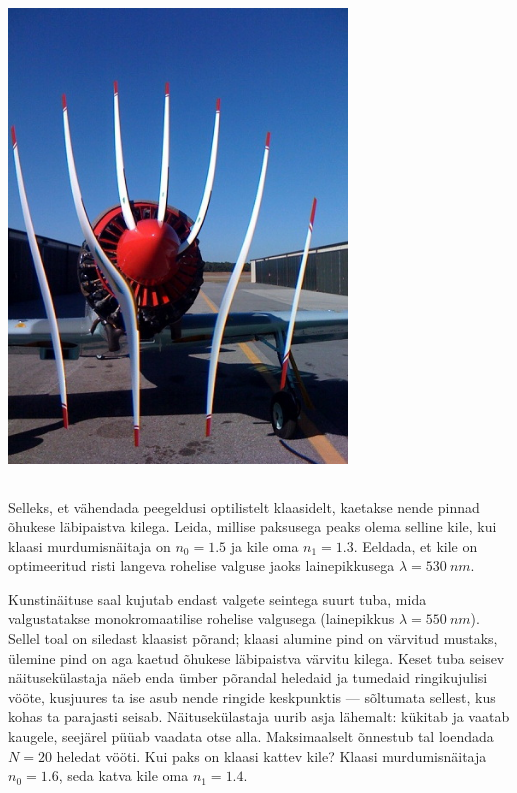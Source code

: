 \documentclass[10pt]{article}
\begin{document}
{\begin{center}
	\includegraphics[width=90mm]{2010-v3g-10-Propeller.jpg}
\end{center}
\probend
\bigskip
\newpage\subsection{\protect{}}


Selleks, et vähendada peegeldusi optilistelt klaasidelt, kaetakse nende pinnad õhukese läbipaistva kilega. Leida, millise paksusega peaks olema selline kile, kui klaasi murdumisnäitaja on $n_0 = \num{1,5}$ ja kile oma $n_1 = \num{1,3}$. Eeldada, et kile on optimeeritud risti langeva rohelise valguse jaoks lainepikkusega $\lambda = \SI{530}{nm}$.
\probend
\bigskip


Kunstinäituse saal kujutab endast valgete seintega suurt tuba, mida valgustatakse monokromaatilise rohelise valgusega (lainepikkus $\lambda=\SI{550}{nm}$).
Sellel toal on siledast klaasist põrand; klaasi
alumine pind on värvitud mustaks, ülemine pind on aga kaetud õhukese läbipaistva värvitu kilega.
Keset tuba seisev näitusekülastaja
näeb enda ümber põrandal heledaid ja tumedaid ringikujulisi vööte, kusjuures ta ise asub nende ringide keskpunktis --- sõltumata sellest, kus kohas ta parajasti seisab. Näitusekülastaja uurib asja lähemalt: kükitab ja vaatab kaugele, seejärel püüab vaadata otse alla. Maksimaalselt õnnestub tal loendada $N=\num{20}$ heledat vööti. Kui paks on klaasi kattev kile?
Klaasi murdumisnäitaja $n_0=\num{1.6}$, seda katva kile oma $n_1=\num{1.4}$.
\probend
\bigskip
\newpage\subsection{\protect{}}

}
\end{document}
